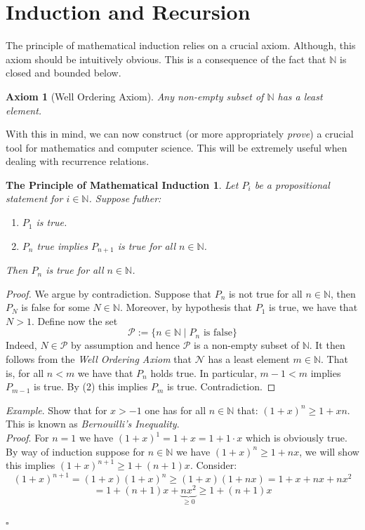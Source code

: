 \documentclass[9pt]{article} %
\newtheorem*{axiom}{Axiom}
\newtheorem*{ind}{The Principle of Mathematical Induction}
\newcommand{\NN}{\mathbb{N}} %
\begin{document}
	\section{\large Induction and Recursion}
	
	The principle of mathematical induction relies on a crucial axiom. Although, this axiom should be intuitively obvious. This is a consequence of the fact that $\NN$ is closed and bounded below.
	\begin{axiom}[Well Ordering Axiom]
		Any non-empty subset of $\NN$ has a least element.
	\end{axiom}
	With this in mind, we can now construct (or more appropriately \emph{prove}) a crucial tool for mathematics and computer science. This will be extremely useful when dealing with recurrence relations. 
	\begin{ind}
		Let $P_i$ be a propositional statement for $i \in \NN$. Suppose futher:
		\begin{enumerate}
				\item $P_1$ is true.
				\item $P_n$ true implies $P_{n+1}$ is true for all $n \in \NN$.
		\end{enumerate}
		Then $P_n$ is true for all $n \in \NN$.
	\end{ind}
	\begin{proof}
		We argue by contradiction. Suppose that $P_n$ is not true for all $n \in \NN$, then $P_N$ is false for some $N \in \NN$. Moreover, by hypothesis that $P_1$ is true, we have that $N > 1$. Define now the set
		$$ \mathcal{P} := \{n \in \NN \mid P_n \text{ is false}\}$$
		Indeed, $N \in \mathcal{P}$ by assumption and hence $\mathcal{P}$ is a non-empty subset of $\NN$. It then follows from the \emph{Well Ordering Axiom} that $\mathcal{N}$ has a least element $m \in \NN$. That is, for all $n < m$ we have that $P_n$ holds true. In particular, $m-1 < m$ implies $P_{m-1}$ is true. By (2) this implies $P_m$ is true. Contradiction.
	\end{proof}
	
	\noindent \emph{Example}. Show that for $x > -1$ one has for all $n \in \NN$ that: $(1+x)^n \geq 1 + xn$. This is known as \emph{Bernouilli's Inequality}. \\
	
	\emph{Proof}. For $n=1$ we have $(1+x)^1 = 1+x = 1 + 1\cdot x$ which is obviously true. By way of induction suppose for $n \in \NN$ we have $(1+x)^n \geq 1+nx$, we will show this implies $(1+x)^{n+1} \geq 1+(n+1)x$. Consider:
	$$ (1+x)^{n+1} = (1+x)(1+x)^{n} \geq (1+x)(1+nx) = 1 + x + nx + nx^2$$
	$$ = 1 + (n+1)x + \underbrace{nx^2}_{\geq 0} \geq 1 + (n+1)x$$
	\begin{flushright}
		$\square$
	\end{flushright}
	
\end{document}
